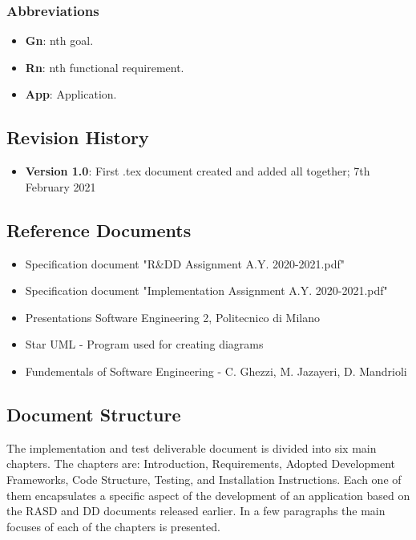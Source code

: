 \subsubsection{Abbreviations}
\begin{itemize}
	\item \textbf{Gn}: nth goal.
	\item \textbf{Rn}: nth functional requirement.
	\item \textbf{App}: Application.
\end{itemize}

\newpage
\subsection{Revision History}
\begin{itemize}
	\item \textbf{Version 1.0}: First .tex document created and added all together; 7th February 2021
\end{itemize}

\newpage
\subsection{Reference Documents}
\begin{itemize}
	\item Specification document "R\&DD Assignment A.Y. 2020-2021.pdf"
	\item Specification document "Implementation Assignment A.Y. 2020-2021.pdf"
	\item Presentations Software Engineering 2, Politecnico di Milano
	\item Star UML - Program used for creating diagrams
	\item Fundementals of Software Engineering - C. Ghezzi, M. Jazayeri, D. Mandrioli
\end{itemize}


\newpage
\subsection{Document Structure}
\hspace{\parindent} The implementation and test deliverable document is divided into six main chapters. The chapters are: Introduction, Requirements, Adopted Development Frameworks, Code Structure, Testing, and Installation Instructions. Each one of them encapsulates a specific aspect of the development of an application based on the RASD and DD documents released earlier. In a few paragraphs the main focuses of each of the chapters is presented.\newline

